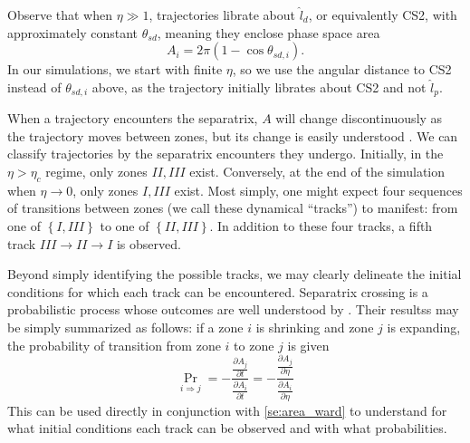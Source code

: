\documentclass[
        fleqn,
        usenatbib,
    ]{mnras}
\newcommand*{\pd}[2]{\frac{\partial#1}{\partial#2}}
\newcommand*{\p}[1]{\left(#1\right)}
\newcommand*{\z}[1]{\left\{#1\right\}}
\begin{document}
Observe that when $\eta \gg 1$, trajectories librate about $\hat{l}_d$, or
equivalently CS2, with approximately constant $\theta_{sd}$, meaning they
enclose phase space area
\begin{equation}
    A_i = 2\pi\p{1 - \cos \theta_{sd, i}}.\label{eq:ai_qsd}
\end{equation}
In our simulations, we start with finite $\eta$, so we use the angular distance
to CS2 instead of $\theta_{sd, i}$ above, as the trajectory initially librates
about CS2 and not $\hat{l}_p$.

When a trajectory encounters the separatrix, $A$ will change discontinuously as
the trajectory moves between zones, but its change is easily understood
\citep{henrard1982}. We can classify trajectories by the separatrix encounters
they undergo. Initially, in the $\eta > \eta_c$ regime, only zones $II, III$
exist. Conversely, at the end of the simulation when $\eta \to 0$, only zones
$I, III$ exist. Most simply, one might expect four sequences of transitions
between zones (we call these dynamical ``tracks'') to manifest: from one of
$\z{I, III}$ to one of $\z{II, III}$. In addition to these four tracks, a
fifth track $III \to II \to I$ is observed.

Beyond simply identifying the possible tracks, we may clearly delineate the
initial conditions for which each track can be encountered. Separatrix crossing
is a probabilistic process whose outcomes are well understood by
\citealp{henrard1982,henrard1987}. Their resultss may be simply summarized as
follows: if a zone $i$ is shrinking and zone $j$ is expanding, the probability
of transition from zone $i$ to zone $j$ is given
\begin{equation}
    \Pr_{i \Rightarrow j} = -\frac{\pd{A_j}{t}}{ \pd{A_i}{t}}
        = -\frac{\pd{A_j}{\eta}}{ \pd{A_i}{\eta}}\label{eq:henrard_hop}
\end{equation}
This can be used directly in conjunction with \autoref{se:area_ward} to
understand for what initial conditions each track can be observed and with what
probabilities.
\end{document}
